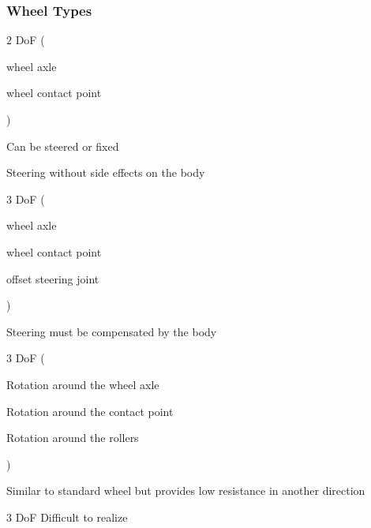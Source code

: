 \subsubsection{Wheel Types}
\begin{itemize}
        \begin{itemize*}
            \item $2$ DoF
                (\begin{itemize*}
                    \item wheel axle
                    \item wheel contact point
                \end{itemize*})
            \item Can be steered or fixed
            \item Steering without side effects on the body
        \end{itemize*}
        \begin{itemize*}
            \item $3$ DoF
                (\begin{itemize*}
                    \item wheel axle
                    \item wheel contact point
                    \item offset steering joint
                \end{itemize*})
            \item Steering must be compensated by the body
        \end{itemize*}
        \begin{itemize*}
            \item $3$ DoF
                (\begin{itemize*}
                    \item Rotation around the wheel axle
                    \item Rotation around the contact point
                    \item Rotation around the rollers
                \end{itemize*})
            \item Similar to standard wheel but provides low resistance in another direction
        \end{itemize*}
        \begin{itemize*}
            \item $3$ DoF
            \icon Difficult to realize
        \end{itemize*}
\end{itemize}

